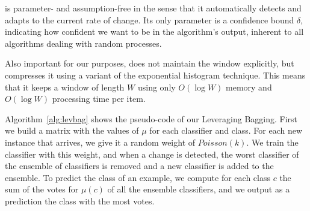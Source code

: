 \adwin is parameter- and assumption-free in the sense that 
it automatically detects and adapts to the current rate of change. 
Its only parameter is a confidence bound $\delta$,
indicating how confident we want to be in the algorithm's output, 
inherent to all algorithms dealing with random processes. 

Also important for our purposes, \adwin does not maintain the window
explicitly, but compresses it using a variant of the exponential histogram
technique. %
This means that it keeps a window of length $W$
using only $O(\log W)$ memory and $O(\log W)$ processing time per item. %


Algorithm~\ref{alg:levbag} shows the pseudo-code of our Leveraging Bagging.
First we build a matrix with the values of $\mu$ for each classifier and class. 
For each new instance that arrives,  we give it a random weight of $Poisson(k)$.
We train the classifier with this weight,
and when a change is detected, the worst classifier of the ensemble of classifiers 
is removed and a new classifier is added to the ensemble.
To predict the class of an example, we compute for each class $c$ the sum of the votes for $\mu(c)$ of all the ensemble classifiers, and we output as a prediction the class with the most votes.


